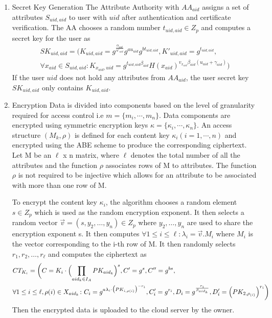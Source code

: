 \begin{enumerate}
	\item Secret Key Generation
	The Attribute Authority with $ AA_{aid} $ assigns a set of attributes $ S_{uid,aid} $ to user with $ uid $ after authentication and certificate verification. The AA chooses a random number $ t_{uid,aid} \in Z_{p} $ and computes a secret key for the user as
	\begin{align*}
		SK_{uid,aid} = (K_{uid,aid} = g^{\frac{\alpha_{aid}}{u'_{uid}}}g^{au_{uid}}g^{bt_{uid,aid}}, K'_{uid,aid} = g^{t_{uid,aid}}, \\
		\forall x_{aid} \in S_{uid,aid} \colon K_{x_{aid},uid} = g^{t_{uid,aid}\beta_{aid}}H(x_{aid})^{v_{x_{aid}}\beta_{aid}(u_{uid} + \gamma_{aid})})
	\end{align*}
	If the user $ uid $ does not hold any attributes from $ AA_{aid} $, the user secret key $ SK_{uid,aid} $ only contains $ K_{uid,aid} $.
	
	\item Encryption
	Data is divided into components based on the level of granularity required for access control i.e $ m = \{m_{i}, \cdots, m_{n}\} $. Data components are encrypted using symmetric encryption keys $ \kappa = \{\kappa_{i}, \cdots, \kappa_{n}\} $. An access structure $ (M_{k}, \rho) $ is defined for each content key $ \kappa_{i} (i = 1, \cdots, n) $ and encrypted using the ABE scheme to produce the corresponding ciphertext. Let M be an $\ell$ x n matrix, where $\ell$ denotes the total number of all the attributes and the function $ \rho $ associates rows of M to attributes. The function $\rho$ is not required to be injective which allows for an attribute to be associated with more than one row of M.
	
	To encrypt the content key $\kappa_{i}$, the algorithm chooses a random element $ s \in Z_{p} $ which is used as the random encryption exponent. It then selects a random vector $ \vec{v} = (s, y_{2},\ldots,y_{n}) \in Z_{p} $ where $ y_{2},\ldots,y_{n} $ are used to share the encryption exponent s. It then computes $ \forall 1 \leq i \leq \ell: \lambda_{i} = \vec{v}.M_{i} $ where $ M_{i} $ is the vector corresponding to the i-th row of M. It then randomly selects $ r_{1},r_{2},\ldots,r_{\ell} $ and computes the ciphertext as	
	\begin{align*}
		&CT_{K_{i}} = \biggl(C = K_{i}\cdot\Bigl(\prod\limits_{aid_{k} \in I_{A}}PK_{aid_{k}}\Bigl)^{s}, C' = g^{s}, C'' = g^{bs},\\
		&\forall 1 \leq i \leq \ell, \rho(i) \in X_{aid_{k}} \colon C_{i} = g^{a\lambda_{i}\cdot\bigl(PK_{i,\rho(i)}\bigl)^{-r_{i}}}, C'_{i} = g^{r_{i}},D_{i} = g^{\frac{r_{i}}{\beta_{aid_k}}}, D'_{i} = \Bigl(PK_{2,\rho_{(i)}}\Bigl)^{r_{i}}\biggl)
	\end{align*}
	Then the encrypted data is uploaded to the cloud server by the owner.
	

\end{enumerate}
